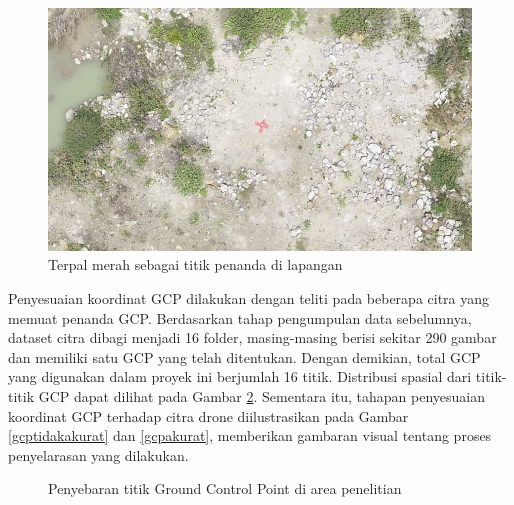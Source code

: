 \begin{figure} [H]
    \centering
    \includegraphics[width = 11.5cm]{image/tanda GCP di lapangan.png}
    \caption{Terpal merah sebagai titik penanda di lapangan}
    \label{terpal merah}
\end{figure}

Penyesuaian koordinat GCP dilakukan dengan teliti pada beberapa citra yang memuat penanda GCP. Berdasarkan tahap pengumpulan data sebelumnya, dataset citra dibagi menjadi 16 folder, masing-masing berisi sekitar 290 gambar dan memiliki satu GCP yang telah ditentukan. Dengan demikian, total GCP yang digunakan dalam proyek ini berjumlah 16 titik. Distribusi spasial dari titik-titik GCP dapat dilihat pada Gambar \ref{penyebaran}. Sementara itu, tahapan penyesuaian koordinat GCP terhadap citra drone diilustrasikan pada Gambar \ref{gcptidakakurat} dan \ref{gcpakurat}, memberikan gambaran visual tentang proses penyelarasan yang dilakukan.

\begin{figure} [H]
    \centering
    \caption{Penyebaran titik Ground Control Point di area penelitian}
    \label{penyebaran}
\end{figure}

